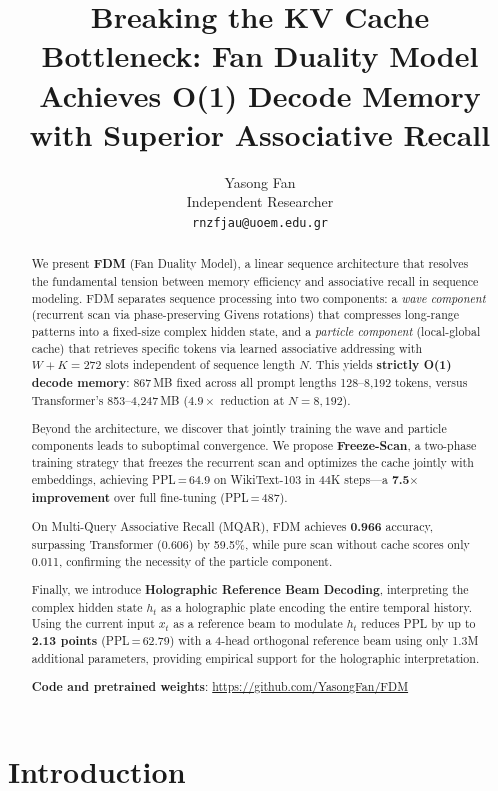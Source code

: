 \documentclass{article}
\title{Breaking the KV Cache Bottleneck: Fan Duality Model\\
Achieves O(1) Decode Memory with Superior Associative Recall}
\author{
  Yasong Fan \\
  Independent Researcher \\
  \texttt{rnzfjau@uoem.edu.gr}
}
\begin{document}
\maketitle

\begin{abstract}
We present \textbf{FDM} (Fan Duality Model), a linear sequence architecture
that resolves the fundamental tension between memory efficiency and associative
recall in sequence modeling.
FDM separates sequence processing into two components:
a \emph{wave component} (recurrent scan via phase-preserving Givens rotations)
that compresses long-range patterns into a fixed-size complex hidden state,
and a \emph{particle component} (local-global cache) that retrieves specific
tokens via learned associative addressing with $W{+}K{=}272$ slots
independent of sequence length $N$.
This yields \textbf{strictly O(1) decode memory}:
867\,MB fixed across all prompt lengths 128--8{,}192 tokens,
versus Transformer's 853--4{,}247\,MB ($4.9\times$ reduction at $N{=}8{,}192$).

Beyond the architecture, we discover that jointly training the wave and
particle components leads to suboptimal convergence.
We propose \textbf{Freeze-Scan}, a two-phase training strategy that
freezes the recurrent scan and optimizes the cache jointly with embeddings,
achieving PPL\,=\,64.9 on WikiText-103 in 44K steps---a
\textbf{7.5$\times$ improvement} over full fine-tuning (PPL\,=\,487).

On Multi-Query Associative Recall (MQAR), FDM achieves \textbf{0.966} accuracy,
surpassing Transformer (0.606) by 59.5\%, while pure scan without cache
scores only 0.011, confirming the necessity of the particle component.

Finally, we introduce \textbf{Holographic Reference Beam Decoding},
interpreting the complex hidden state $h_t$ as a holographic plate
encoding the entire temporal history.
Using the current input $x_t$ as a reference beam to modulate $h_t$
reduces PPL by up to \textbf{2.13 points} (PPL\,=\,62.79) with a
4-head orthogonal reference beam using only 1.3M additional parameters,
providing empirical support for the holographic interpretation.

\textbf{Code and pretrained weights}: \url{https://github.com/YasongFan/FDM}
\end{abstract}

\section{Introduction}
\end{document}
